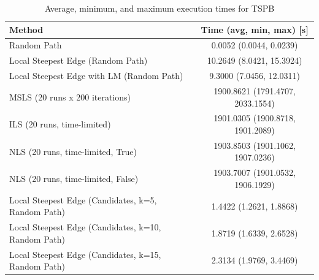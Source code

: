 \begin{table}[h!]
\centering
\begin{tabular}{lc}
\hline
Method & Time (avg, min, max) [s] \\
\hline
Random Path & 0.0052 (0.0044, 0.0239) \\
Local Steepest Edge (Random Path) & 10.2649 (8.0421, 15.3924) \\
Local Steepest Edge with LM (Random Path) & 9.3000 (7.0456, 12.0311) \\
MSLS (20 runs x 200 iterations) & 1900.8621 (1791.4707, 2033.1554) \\
ILS (20 runs, time-limited) & 1901.0305 (1900.8718, 1901.2089) \\
NLS (20 runs, time-limited, True) & 1903.8503 (1901.1062, 1907.0236) \\
NLS (20 runs, time-limited, False) & 1903.7007 (1901.0532, 1906.1929) \\
Local Steepest Edge (Candidates, k=5, Random Path) & 1.4422 (1.2621, 1.8868) \\
Local Steepest Edge (Candidates, k=10, Random Path) & 1.8719 (1.6339, 2.6528) \\
Local Steepest Edge (Candidates, k=15, Random Path) & 2.3134 (1.9769, 3.4469) \\
\hline
\end{tabular}
\caption{Average, minimum, and maximum execution times for TSPB}
\label{tab:TSPB_timings}
\end{table}
